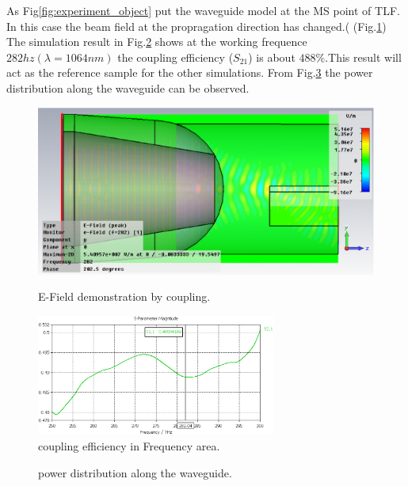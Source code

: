 As Fig\ref{fig:experiment_object} put  the  waveguide model at the MS point of TLF. In this case the beam field at the propragation direction has changed.( (Fig.\ref{fig:coupling_e_field}) The simulation result in Fig.\ref{fig:orignial_coupling_efficiency} shows at the working frequence $282hz(\lambda=1064 nm)$ the coupling efficiency ($S_{21}$) is about $488\%$.This result will act as the reference sample for the other simulations. From Fig.\ref{fig:power_distribution} the power distribution along the waveguide can be observed. 
\begin{figure}
\centering
	\includegraphics[width=0.5 \textwidth]{bilder/basic_waveguide_efield}
	\label{fig:coupling_e_field}
	\caption{E-Field demonstration by  coupling.}
\end{figure}
\begin{figure}
\centering
\includegraphics[width=0.7\textwidth]{bilder/cst_basic_waveguide_S21}
\caption{coupling efficiency in Frequency area.}
\label{fig:orignial_coupling_efficiency}
\end{figure}

\begin{figure}
\centering
\caption{power distribution along the waveguide.}
\label{fig:power_distribution}
\end{figure}

